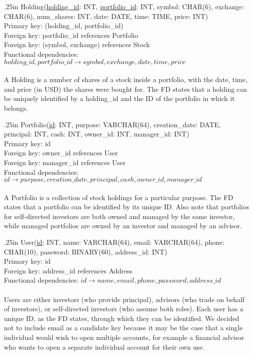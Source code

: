 \documentclass[letterpaper]{report}
\begin{document}
\hangindent .25in
{\sffamily Holding(\underline{holding\_id}: INT, \underline{portfolio\_id}: INT, symbol: CHAR(6), exchange: CHAR(6), num\_shares: INT, date: DATE, time: TIME, price: INT)} \\
Primary key: {\sffamily (holding\_id, portfolio\_id)} \\
Foreign key: {\sffamily portfolio\_id} references {\sffamily Portfolio} \\
Foreign key: {\sffamily (symbol, exchange)} references {\sffamily Stock} \\
Functional dependencies: $holding\_id, portfolio\_id \to symbol, exchange, date, time, price$ \\\\
A {\sffamily Holding} is a number of shares of a stock inside a portfolio, with the date, time, and price (in USD) the shares were bought for. The FD states that a holding can be uniquely identified by a {\sffamily holding\_id} and the ID of the portfolio in which it belongs.

\hangindent .25in
{\sffamily Portfolio(\underline{id}: INT, purpose: VARCHAR(64), creation\_date: DATE, principal: INT, cash: INT, owner\_id: INT, manager\_id: INT)} \\
Primary key: {\sffamily id} \\
Foreign key: {\sffamily owner\_id} references {\sffamily User} \\
Foreign key: {\sffamily manager\_id} references {\sffamily User} \\
Functional dependencies: $id \to purpose, creation\_date, principal, cash, owner\_id, manager\_id$ \\\\
A {\sffamily Portfolio} is a collection of stock holdings for a particular purpose. The FD states that a portfolio can be identified by its unique ID. Also note that portfolios for self-directed investors are both owned and managed by the same investor, while managed portfolios are owned by an investor and managed by an advisor.


\hangindent .25in
{\sffamily User(\underline{id}: INT, name: VARCHAR(64), email: VARCHAR(64), phone: CHAR(10), password: BINARY(60), address\_id: INT)}\\
Primary key: {\sffamily id} \\
Foreign key: {\sffamily address\_id} references {\sffamily Address} \\
Functional dependencies: $id \to name, email, phone, password, address\_id$ \\\\
{\sffamily User}s are either investors (who provide principal), advisors (who trade on behalf of investors), or self-directed investors (who assume both roles). Each user has a unique ID, as the FD states, through which they can be identified. We decided not to include \textsf{email} as a candidate key because it may be the case that a single individual would wish to open multiple accounts, for example a financial advisor who wants to open a separate individual account for their own use.
\end{document}
